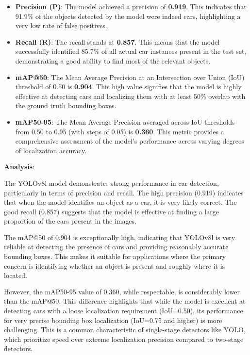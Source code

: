 \documentclass[12pt,a4paper]{article}
\begin{document}
\begin{itemize}
    \item \textbf{Precision (P)}: The model achieved a precision of \textbf{0.919}. This indicates that 91.9\% of the objects detected by the model were indeed cars, highlighting a very low rate of false positives.
    \item \textbf{Recall (R)}: The recall stands at \textbf{0.857}. This means that the model successfully identified 85.7\% of all actual car instances present in the test set, demonstrating a good ability to find most of the relevant objects.
    \item \textbf{mAP@50}: The Mean Average Precision at an Intersection over Union (IoU) threshold of 0.50 is \textbf{0.904}. This high value signifies that the model is highly effective at detecting cars and localizing them with at least 50\% overlap with the ground truth bounding boxes.
    \item \textbf{mAP50-95}: The Mean Average Precision averaged across IoU thresholds from 0.50 to 0.95 (with steps of 0.05) is \textbf{0.360}. This metric provides a comprehensive assessment of the model's performance across varying degrees of localization accuracy.
\end{itemize}

\textbf{Analysis}:

The YOLOv8l model demonstrates strong performance in car detection, particularly in terms of precision and recall. The high precision (0.919) indicates that when the model identifies an object as a car, it is very likely correct. The good recall (0.857) suggests that the model is effective at finding a large proportion of the cars present in the images.

The mAP@50 of 0.904 is exceptionally high, indicating that YOLOv8l is very reliable at detecting the presence of cars and providing reasonably accurate bounding boxes. This makes it suitable for applications where the primary concern is identifying whether an object is present and roughly where it is located.

However, the mAP50-95 value of 0.360, while respectable, is considerably lower than the mAP@50. This difference highlights that while the model is excellent at detecting cars with a loose localization requirement (IoU=0.50), its performance for very precise bounding box localization (IoU=0.75 and higher) is more challenging. This is a common characteristic of single-stage detectors like YOLO, which prioritize speed over extreme localization precision compared to two-stage detectors.
\end{document}
